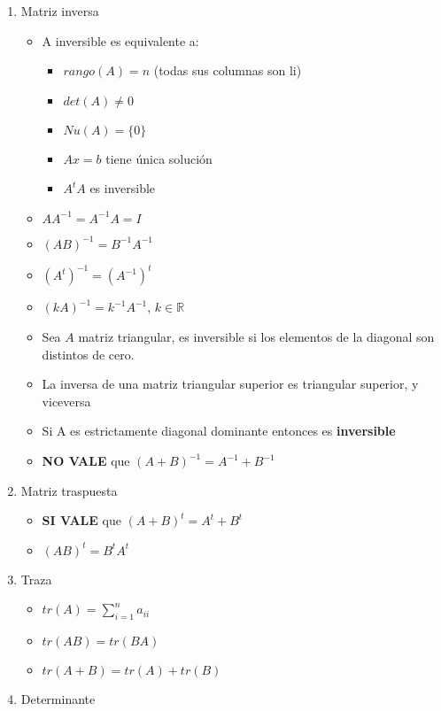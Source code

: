 \begin{enumerate}
\begin{itemize}
    \end{itemize}    
    
    \item Matriz inversa
    \begin{itemize}
    \item A inversible es equivalente a:
        \begin{itemize}
        \item $rango(A) = n$ (todas sus columnas son li)
        \item $det(A)\neq0$
        \item $Nu(A) = \{0\}$
        \item $Ax=b$ tiene única solución
        \item $A^tA$ es inversible
        \end{itemize}
    \item $AA^{-1} = A^{-1}A = I$
    \item $(AB)^{-1} = B^{-1}A^{-1}$
    \item $(A^t)^{-1} = (A^{-1})^t$
    \item $(kA)^{-1} = k^{-1} A^{-1}$, $k\in\mathbb{R}$
    \item Sea $A$ matriz triangular, es inversible si los elementos de la diagonal son distintos de cero. 
    \item La inversa de una matriz triangular superior es triangular {superior}, y viceversa
    \item {Si A es estrictamente diagonal dominante entonces es \textbf{inversible}}
    \item {\textbf{NO VALE} que $(A+B)^{-1} = A^{-1} + B^{-1}$}
    \end{itemize}
    \item Matriz traspuesta
    \begin{itemize}
        \item {\textbf{SI VALE} que $(A+B)^t = A^t + B^t$}
        \item $(AB)^t = B^tA^t$
    \end{itemize}
    \item Traza
    \begin{itemize}
        \item $tr(A) = \sum_{i=1}^{n}a_{ii}$ 
    \item $tr(AB) = tr(BA)$
    \item $tr(A+B) = tr(A)+tr(B)$
    \end{itemize}
    \item Determinante
    \begin{itemize}

\end{itemize}
\end{enumerate}
